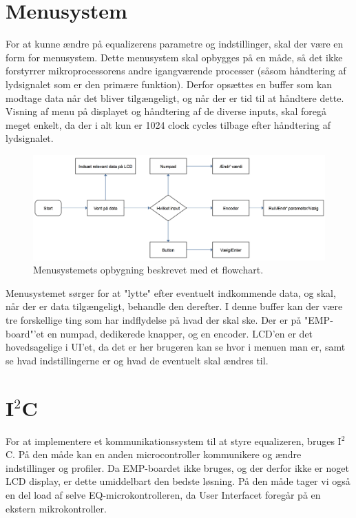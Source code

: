 \section{Menusystem}\label{sec:menu}
For at kunne ændre på equalizerens parametre og indstillinger, skal der være en form for menusystem. Dette menusystem skal opbygges på en måde, så det ikke forstyrrer mikroprocessorens andre igangværende processer (såsom håndtering af lydsignalet som er den primære funktion). Derfor opsættes en buffer som kan modtage data når det bliver tilgængeligt, og når der er tid til at håndtere dette. Visning af menu på displayet og håndtering af de diverse inputs, skal foregå meget enkelt, da der i alt kun er 1024 clock cycles tilbage efter håndtering af lydsignalet. \\

\begin{figure}[h]
	\centering
	\includegraphics[width=15cm]{billeder/ui_flowchart}
	\caption{Menusystemets opbygning beskrevet med et flowchart. }
\end{figure}

Menusystemet sørger for at "lytte" efter eventuelt indkommende data, og skal, når der er data tilgængeligt, behandle den derefter. I denne buffer kan der være tre forskellige ting som har indflydelse på hvad der skal ske. Der er på "EMP-board"'et en numpad, dedikerede knapper, og en encoder. LCD'en er det hovedsagelige i UI'et, da det er her brugeren kan se hvor i menuen man er, samt se hvad indstillingerne er og hvad de eventuelt skal ændres til.

\section{I$^2$C}\label{sec:i2c}
For at implementere et kommunikationssystem til at styre equalizeren, bruges I$^2$C. På den måde kan en anden microcontroller kommunikere og ændre indstillinger og profiler. Da EMP-boardet ikke bruges, og der derfor ikke er noget LCD display, er dette umiddelbart den bedste løsning. På den måde tager vi også en del load af selve EQ-microkontrolleren, da User Interfacet foregår på en ekstern mikrokontroller.


